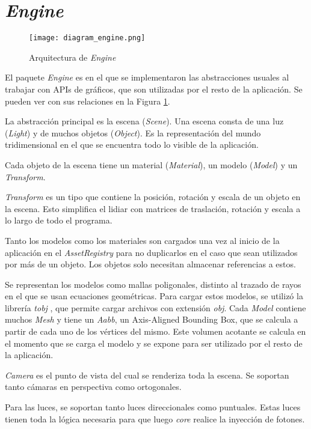 \section{\textit{Engine}}

\begin{figure}[ht]
    \centering
    \texttt{[image: diagram\_engine.png]}
    \caption{Arquitectura de \textit{Engine}}
    \label{fig:engine_architecture}
\end{figure}

El paquete \textit{Engine} es en el que se implementaron las abstracciones usuales al trabajar con APIs de gráficos, que son utilizadas por el resto de la aplicación.
Se pueden ver con sus relaciones en la Figura \ref{fig:engine_architecture}.

La abstracción principal es la escena (\textit{Scene}).
Una escena consta de una luz (\textit{Light}) y de muchos objetos (\textit{Object}).
Es la representación del mundo tridimensional en el que se encuentra todo lo visible de la aplicación.

Cada objeto de la escena tiene un material (\textit{Material}), un modelo (\textit{Model}) y un \textit{Transform}.

\textit{Transform} es un tipo que contiene la posición, rotación y escala de un objeto en la escena.
Esto simplifica el lidiar con matrices de traslación, rotación y escala a lo largo de todo el programa.

Tanto los modelos como los materiales son cargados una vez al inicio de la aplicación en el \textit{AssetRegistry} para no duplicarlos en el caso que sean utilizados por más de un objeto.
Los objetos solo necesitan almacenar referencias a estos.

Se representan los modelos como mallas poligonales, distinto al trazado de rayos en el que se usan ecuaciones geométricas.
Para cargar estos modelos, se utilizó la librería \textit{tobj} \cite{tobj-crate}, que permite cargar archivos con extensión \textit{obj}.
Cada \textit{Model} contiene muchos \textit{Mesh} y tiene un \textit{Aabb}, un Axis-Aligned Bounding Box, que se calcula a partir de cada uno de los vértices del mismo.
Este volumen acotante se calcula en el momento que se carga el modelo y se expone para ser utilizado por el resto de la aplicación.

\textit{Camera} es el punto de vista del cual se renderiza toda la escena.
Se soportan tanto cámaras en perspectiva como ortogonales.

Para las luces, se soportan tanto luces direccionales como puntuales.
Estas luces tienen toda la lógica necesaria para que luego \textit{core} realice la inyección de fotones.

